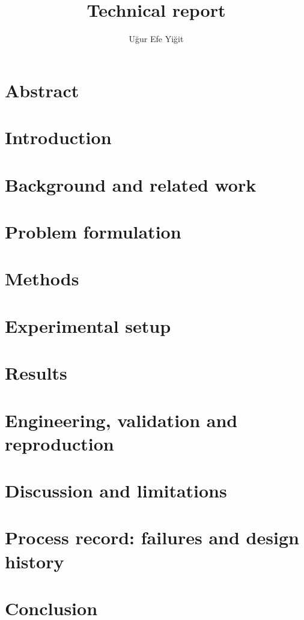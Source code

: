 \documentclass[11pt]{report}
\title{\\[1ex]\large Technical report}
\author{Uğur Efe Yiğit}
\date{}
\begin{document}
\maketitle
\tableofcontents

\chapter*{Abstract}


\chapter{Introduction}


\chapter{Background and related work}


\chapter{Problem formulation}



\chapter{Methods}



\chapter{Experimental setup}


\chapter{Results}




\chapter{Engineering, validation and reproduction}


\chapter{Discussion and limitations}



\chapter{Process record: failures and design history}


\chapter{Conclusion}




\end{document}
